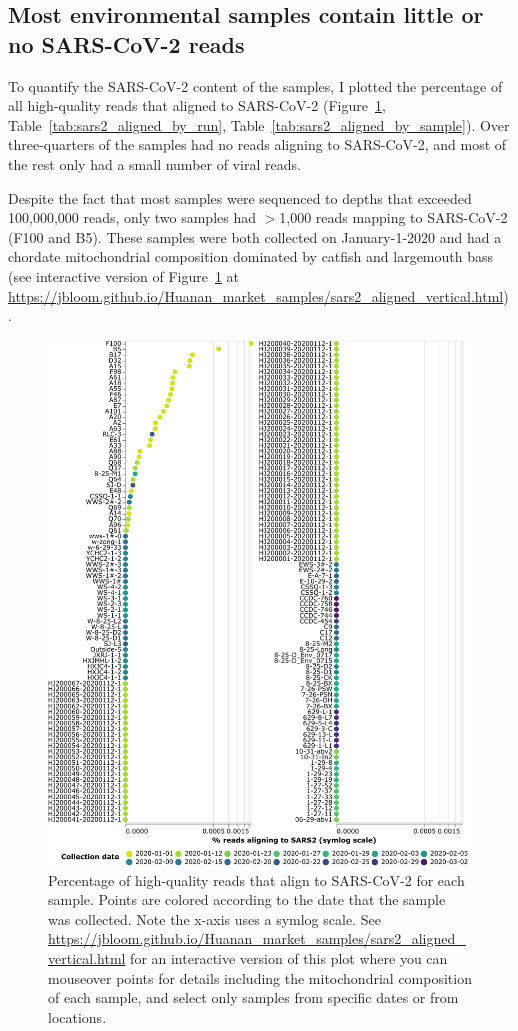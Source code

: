 \documentclass[9pt,twocolumn,twoside]{gsajnl_modified}
\begin{document}
\subsection{Most environmental samples contain little or no SARS-CoV-2 reads}
To quantify the SARS-CoV-2 content of the samples, I plotted the percentage of all high-quality reads that aligned to SARS-CoV-2 (Figure~\ref{fig:sars2_aligned}, Table~\ref{tab:sars2_aligned_by_run}, Table~\ref{tab:sars2_aligned_by_sample}).
Over three-quarters of the samples had no reads aligning to SARS-CoV-2, and most of the rest only had a small number of viral reads.

Despite the fact that most samples were sequenced to depths that exceeded 100,000,000 reads, only two samples had $>$1,000 reads mapping to SARS-CoV-2 (F100 and B5).
These samples were both collected on January-1-2020 and had a chordate mitochondrial composition dominated by catfish and largemouth bass (see interactive version of Figure~\ref{fig:sars2_aligned} at \url{https://jbloom.github.io/Huanan_market_samples/sars2_aligned_vertical.html}).

\begin{figure}
\centerline{\includegraphics[width=0.85\linewidth]{figures/sars2_aligned.pdf}}
\caption{
Percentage of high-quality reads that align to SARS-CoV-2 for each sample.
Points are colored according to the date that the sample was collected.
Note the x-axis uses a symlog scale.
See \url{https://jbloom.github.io/Huanan_market_samples/sars2_aligned_vertical.html} for an interactive version of this plot where you can mouseover points for details including the mitochondrial composition of each sample, and select only samples from specific dates or from locations.
\label{fig:sars2_aligned}
}
\end{figure}
\end{document}

